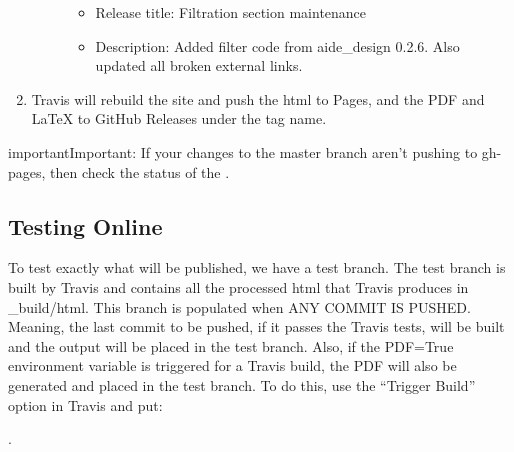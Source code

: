 \documentclass[letterpaper,10pt,english]{sphinxmanual}
\begin{document}
\begin{enumerate}
\begin{description}
\begin{itemize}
\item {} 
Release title: Filtration section maintenance

\item {} 
Description: Added filter code from aide\_design 0.2.6. Also updated all broken external links.

\end{itemize}

\end{description}

\item {} 
Travis will rebuild the site and push the html to Pages, and the PDF and LaTeX to GitHub Releases under the tag name.

\end{enumerate}

\begin{sphinxadmonition}{important}{Important:}
If your changes to the master branch aren’t pushing to gh-pages, then check the status of the .
\end{sphinxadmonition}


\subsection{Testing Online}
\label{\detokenize{Textbook_Creation_Help/rst_intro:testing-online}}\label{\detokenize{Textbook_Creation_Help/rst_intro:id4}}
To test exactly what will be published, we have a test branch. The test branch is built by Travis and contains all the processed html that Travis produces in \_build/html. This branch is populated when ANY COMMIT IS PUSHED. Meaning, the last commit to be pushed, if it passes the Travis tests, will be built and the output will be placed in the test branch. Also, if the PDF=True environment variable is triggered for a Travis build, the PDF will also be generated and placed in the test branch. To do this, use the “Trigger Build” option in Travis and put:

%
\begin{sphinxVerbatim}[commandchars=\\\{\}]
     
\end{sphinxVerbatim}

.
\end{document}
